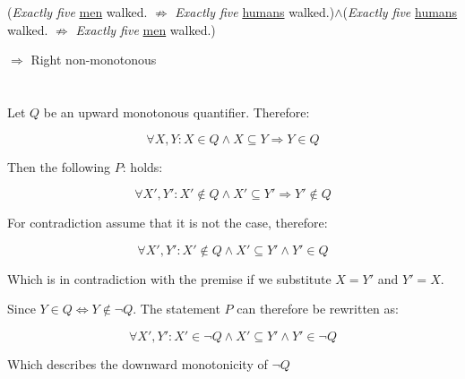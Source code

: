 \documentclass{article}
\begin{document}
(\textit{Exactly five} \underline{men} walked.
$\not\Rightarrow$
\textit{Exactly five} \underline{humans} walked.)$\wedge$(\textit{Exactly five} \underline{humans} walked.
$\not\Rightarrow$
\textit{Exactly five} \underline{men} walked.)

$\Rightarrow$
Right non-monotonous

\section{}

\text{}

Let $Q$ be an upward monotonous quantifier. Therefore:

$$\forall X, Y: X \in Q \wedge X \subseteq Y \Rightarrow Y \in Q$$

Then the following $P$: holds:

$$\forall X', Y': X' \not\in Q \wedge X' \subseteq Y' \Rightarrow Y' \not\in Q$$

For contradiction assume that it is not the case, therefore:

$$\forall X', Y': X' \not\in Q \wedge X' \subseteq Y' \wedge Y' \in Q$$

Which is in contradiction with the premise if we substitute $X=Y'$ and $Y'=X$.

Since $Y\in Q \Leftrightarrow Y \not\in \neg Q$. The statement $P$ can therefore be rewritten as:

$$\forall X', Y': X' \in \neg Q \wedge X' \subseteq Y' \wedge Y' \in \neg Q$$


Which describes the downward monotonicity of $\neg Q$
\end{document}
